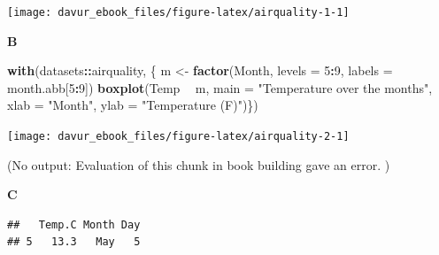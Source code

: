 \documentclass[]{book}
\newenvironment{Shaded}{\begin{snugshade}}{\end{snugshade}}
\newcommand{\CommentTok}[1]{\textcolor[rgb]{0.56,0.35,0.01}{\textit{#1}}}
\newcommand{\DataTypeTok}[1]{\textcolor[rgb]{0.13,0.29,0.53}{#1}}
\newcommand{\DecValTok}[1]{\textcolor[rgb]{0.00,0.00,0.81}{#1}}
\newcommand{\KeywordTok}[1]{\textcolor[rgb]{0.13,0.29,0.53}{\textbf{#1}}}
\newcommand{\NormalTok}[1]{#1}
\newcommand{\OperatorTok}[1]{\textcolor[rgb]{0.81,0.36,0.00}{\textbf{#1}}}
\newcommand{\StringTok}[1]{\textcolor[rgb]{0.31,0.60,0.02}{#1}}
\begin{document}
\begin{center}\texttt{[image: davur\_ebook\_files/figure-latex/airquality-1-1]} \end{center}

\textbf{B}

\begin{Shaded}
\begin{Highlighting}[]
\KeywordTok{with}\NormalTok{(datasets}\OperatorTok{::}\NormalTok{airquality, \{}
\NormalTok{  m <-}\StringTok{ }\KeywordTok{factor}\NormalTok{(Month, }\DataTypeTok{levels =} \DecValTok{5}\OperatorTok{:}\DecValTok{9}\NormalTok{, }\DataTypeTok{labels =}\NormalTok{ month.abb[}\DecValTok{5}\OperatorTok{:}\DecValTok{9}\NormalTok{])}
  \KeywordTok{boxplot}\NormalTok{(Temp }\OperatorTok{~}\StringTok{ }\NormalTok{m, }
    \DataTypeTok{main =} \StringTok{"Temperature over the months"}\NormalTok{,}
    \DataTypeTok{xlab =} \StringTok{"Month"}\NormalTok{,}
    \DataTypeTok{ylab =} \StringTok{"Temperature (F)"}\NormalTok{)\})}
\end{Highlighting}
\end{Shaded}

\begin{center}\texttt{[image: davur\_ebook\_files/figure-latex/airquality-2-1]} \end{center}

(No output: Evaluation of this chunk in book building gave an error. )

\textbf{C}

\begin{Shaded}
\end{Shaded}

\begin{verbatim}
##   Temp.C Month Day
## 5   13.3   May   5
\end{verbatim}
\end{document}
